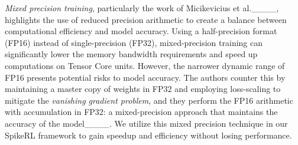 \emph{Mixed precision training}, particularly the work of Micikevicius et
al.____, highlights the use of reduced precision arithmetic to
create a balance between computational efficiency and model accuracy.
Using a half-precision format (FP16) instead of single-precision (FP32),
mixed-precision training can significantly lower the memory bandwidth
requirements and speed up computations on Tensor Core units. However,
the narrower dynamic range of FP16 presents potential risks to model
accuracy. The authors counter this by maintaining a master copy of
weights in FP32 and employing loss-scaling to mitigate the
\emph{vanishing gradient problem}, and they perform the FP16 arithmetic
with accumulation in FP32: a mixed-precision approach that maintains the
accuracy of the model____. We utilize this mixed precision technique in our SpikeRL framework to gain speedup and efficiency without losing performance.

\iffalse
With the knowledge of mixed precision training, distributed training,
and combined architecture of SNN and DeepRL, we move forward to develop our
scalable and efficient SpikeRL infrastructure.
\fi